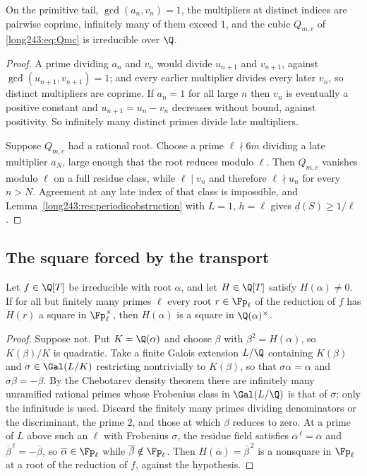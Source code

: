 \begin{lemma}\label{long243:res:reduciblecase}
On the primitive tail, $\gcd(a_n,v_n)=1$, the multipliers at distinct indices
are pairwise coprime, infinitely many of them exceed $1$, and the cubic
$Q_{m,c}$ of \eqref{long243:eq:Qmc} is irreducible over $\Q$.
\end{lemma}

\begin{proof}
A prime dividing $a_n$ and $v_n$ would divide $u_{n+1}$ and $v_{n+1}$, against
$\gcd(u_{n+1},v_{n+1})=1$; and every earlier multiplier divides every later
$v_n$, so distinct multipliers are coprime.  If $a_n=1$ for all large $n$ then
$v_n$ is eventually a positive constant and $u_{n+1}=u_n-v_n$ decreases without
bound, against positivity.  So infinitely many distinct primes divide late
multipliers.

Suppose $Q_{m,c}$ had a rational root.  Choose a prime $\ell\nmid6m$ dividing a
late multiplier $a_N$, large enough that the root reduces modulo $\ell$.  Then
$Q_{m,c}$ vanishes modulo $\ell$ on a full residue class, while $\ell\mid v_n$
and therefore $\ell\nmid u_n$ for every $n>N$.  Agreement at any late index of
that class is impossible, and
Lemma~\ref{long243:res:periodicobstruction} with $L=1$, $h=\ell$ gives
$\underline d(S)\ge1/\ell$.
\end{proof}

\subsection{The square forced by the transport}

\begin{lemma}\label{long243:res:squarespec}
Let $f\in\Q[T]$ be irreducible with root $\alpha$, and let $H\in\Q[T]$ satisfy
$H(\alpha)\ne0$.  If for all but finitely many primes $\ell$ every root
$r\in\Fp_\ell$ of the reduction of $f$ has $H(r)$ a square in $\Fp_\ell^\times$,
then $H(\alpha)$ is a square in $\Q(\alpha)^\times$.
\end{lemma}

\begin{proof}
Suppose not.  Put $K=\Q(\alpha)$ and choose $\beta$ with $\beta^2=H(\alpha)$,
so $K(\beta)/K$ is quadratic.  Take a finite Galois extension $L/\Q$ containing
$K(\beta)$ and $\sigma\in\Gal(L/K)$ restricting nontrivially to $K(\beta)$, so
that $\sigma\alpha=\alpha$ and $\sigma\beta=-\beta$.  By the Chebotarev density
theorem there are infinitely many unramified rational primes whose Frobenius
class in $\Gal(L/\Q)$ is that of $\sigma$; only the infinitude is used.
Discard the finitely many primes dividing denominators or the discriminant,
the prime $2$, and those at which $\beta$ reduces to zero.  At a prime of $L$
above such an $\ell$ with Frobenius $\sigma$, the residue field satisfies
$\overline\alpha^{\,\ell}=\overline\alpha$ and
$\overline\beta^{\,\ell}=-\overline\beta$, so $\overline\alpha\in\Fp_\ell$ while
$\overline\beta\notin\Fp_\ell$.  Then $H(\overline\alpha)=\overline\beta^{\,2}$
is a nonsquare in $\Fp_\ell$ at a root of the reduction of $f$, against the
hypothesis.
\end{proof}

